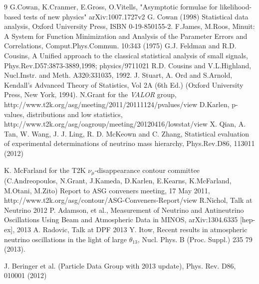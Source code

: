 \begin{thebibliography}{9}
%
%
G.Cowan, K.Cranmer, E.Gross, O.Vitells,
"Asymptotic formulae for likelihood-based tests of new physics"
arXiv:1007.1727v2
  G. Cowan (1998) Statistical data analysis, 
  Oxford University Press, ISBN 0-19-850155-2.
  F.James, M.Roos, Minuit: A System for Function Minimization and Analysis of the 
  Parameter Errors and Correlations, Comput.Phys.Commun. 10:343 (1975)
  G.J. Feldman and R.D. Cousins,
  A Unified approach to the classical statistical analysis of small signals,
  Phys.Rev.D57:3873-3889,1998; physics/9711021
  R.D. Cousins and V.L.Highland, 
  Nucl.Instr. and Meth. A320:331035, 1992.
J. Stuart, A. Ord and S.Arnold,
Kendall's Advanced Theory of Statistics, Vol 2A (6th Ed.) 
(Oxford University Press, New York, 1994).
 N.Grant for the {\em VALOR} group,
 http://www.t2k.org/asg/meeting/2011/20111124/pvalues/view
 D.Karlen,
 p-values, distributions and low statistics,
 http://www.t2k.org/asg/oagroup/meeting/20120416/lowstat/view
 X. Qian, A. Tan, W. Wang, J. J. Ling, R. D. McKeown and C. Zhang,
 Statistical evaluation of experimental determinations of neutrino mass hierarchy,
 Phys.Rev.D86, 113011 (2012)
 
%
%
  K. McFarland for the T2K $\nu_{\mu}$-disappearance contour committee 
  (C.Andreopoulos, N.Grant, J.Kameda, D.Karlen, E.Kearns, K.McFarland, M.Otani, M.Zito)
  Report to ASG conveners meeting, 17 May 2011,
  http://www.t2k.org/asg/contour/ASG-Conveners-Report/view
%
%
  R.Nichol,
  Talk at Neutrino 2012
  P. Adamson, et al.,
  Measurement of Neutrino and Antineutrino Oscillations Using Beam and Atmospheric Data in MINOS,
  arXiv:1304.6335 [hep-ex], 2013
  A. Radovic,
  Talk at DPF 2013
  Y. Itow,
  Recent results in atmospheric neutrino oscillations in the light of large $\theta_{13}$,
  Nucl. Phys. B (Proc. Suppl.) 235 79 (2013).

J. Beringer et al. (Particle Data Group with 2013 update), 
Phys. Rev. D86, 010001 (2012)


\end{thebibliography}
